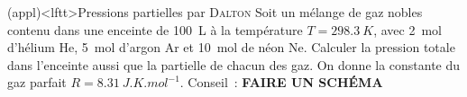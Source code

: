 \documentclass[../../main/main.tex]{subfiles}
\begin{document}
\begin{tcb}[breakable](appl)<lftt>{Pressions partielles par \textsc{Dalton}}
	Soit un mélange de gaz nobles contenu dans une enceinte de \SI{100}{L} à la
	température $T = \SI{298.3}{K}$, avec \SI{2}{mol} d'hélium He, \SI{5}{mol}
	d'argon Ar et \SI{10}{mol} de néon Ne.
	\smallbreak
	Calculer la pression totale dans l'enceinte aussi que la partielle de chacun
	des gaz.
	\smallbreak
	On donne la constante du gaz parfait $R = \SI{8.31}{J.K.mol^{-1}}$.
	\smallbreak
	Conseil~: \textbf{FAIRE UN SCHÉMA}
	\tcblower
	\begin{isd}
		\vspace{-15pt}
		\tcblower
		\vspace{-15pt}
	\end{isd}
	\vspace{-15pt}
\end{tcb}
\end{document}
